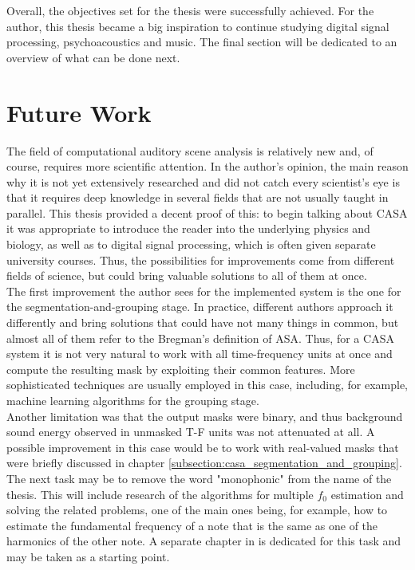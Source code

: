 Overall, the objectives set for the thesis were successfully achieved. For the author, this thesis became a big inspiration to continue studying digital signal processing, psychoacoustics and music. The final section will be dedicated to an overview of what can be done next.

\section{Future Work}

The field of computational auditory scene analysis is relatively new and, of course, requires more scientific attention. In the author's opinion, the main reason why it is not yet extensively researched and did not catch every scientist's eye is that it requires deep knowledge in several fields that are not usually taught in parallel. This thesis provided a decent proof of this: to begin talking about CASA it was appropriate to introduce the reader into the underlying physics and biology, as well as to digital signal processing, which is often given separate university courses. Thus, the possibilities for improvements come from different fields of science, but could bring valuable solutions to all of them at once.\\

The first improvement the author sees for the implemented system is the one for the segmen\-tation-and-grouping stage. In practice, different authors approach it differently and bring solutions that could have not many things in common, but almost all of them refer to the Bregman's definition of ASA. Thus, for a CASA system it is not very natural to work with all time-frequency units at once and compute the resulting mask by exploiting their common features. More sophisticated techniques are usually employed in this case, including, for example, machine learning algorithms for the grouping stage.\\

Another limitation was that the output masks were binary, and thus background sound energy observed in unmasked T-F units was not attenuated at all. A possible improvement in this case would be to work with real-valued masks that were briefly discussed in chapter \ref{subsection:casa_segmentation_and_grouping}.\\

The next task may be to remove the word "monophonic" from the name of the thesis. This will include research of the algorithms for multiple $f_0$ estimation and solving the related problems, one of the main ones being, for example, how to estimate the fundamental frequency of a note that is the same as one of the harmonics of the other note. A separate chapter in \cite{Wang2006} is dedicated for this task and may be taken as a starting point.\\

